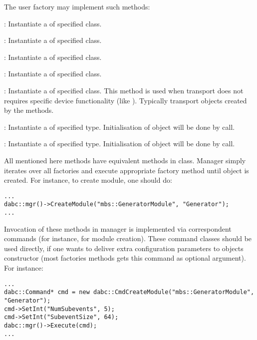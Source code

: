 The user factory may implement such methods:
\bdes
	\item [\func{CreateModule()}] : 
	Instantiate a  of specified class. 
	
\item [\func{CreateDevice()}] : 
	Instantiate a  of specified class. 

\item [\func{CreateThread()}] : 
   Instantiate a  of specified class.
	
\item [\func{CreateApplication()}] : 
	Instantiate a  of specified class.

\item [\func{CreateTransport()}] : 
   Instantiate a  of specified class.
   This method is used when transport does not requires specific device functionality
   (like ). Typically transport objects
   created by the  methods.   
	
\item [\func{CreateDataInput()}] : 
   Instantiate a  of specified type.
   Initialisation of object will be done by  call.

\item [\func{CreateDataOutput()}] : 
   Instantiate a  of specified type.
   Initialisation of object will be done by  call.
	
\edes      

All mentioned here methods have equivalent methods in  class.
Manager simply iterates over all factories and execute appropriate factory method
until object is created. For instance, to create module, one should do:

\begin{small}
\begin{verbatim}
...
dabc::mgr()->CreateModule("mbs::GeneratorModule", "Generator");
...
\end{verbatim}     
\end{small}

Invocation of these methods in manager is implemented via correspondent commands
(for instance,  for module creation). 
These command classes should be used directly, if one wants to deliver extra 
configuration parameters to objects constructor (most factories methods gets
this command as optional argument). For instance:

\begin{small}
\begin{verbatim}
...
dabc::Command* cmd = new dabc::CmdCreateModule("mbs::GeneratorModule", "Generator");
cmd->SetInt("NumSubevents", 5);
cmd->SetInt("SubeventSize", 64);
dabc::mgr()->Execute(cmd);
...
\end{verbatim}     
\end{small}







